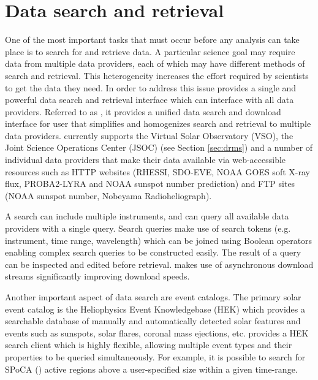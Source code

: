\section{Data search and retrieval}
\label{sec:fido}
One of the most important tasks that must occur before any analysis can take place is to search for and retrieve data.
A particular science goal may require data from multiple data providers, each of which may have different methods of search and retrieval.  
This heterogeneity
increases the effort required by scientists to get the data they need. 
In order to address this issue \sunpypkg provides a single and powerful data search and retrieval interface which can interface with all data providers. 
Referred to as \Fido, it provides a unified data search and download interface for user that simplifies and homogenizes search and retrieval to multiple data providers. 
\Fido currently supports the Virtual Solar Observatory (VSO), the Joint Science Operations Center (JSOC) (see Section \ref{sec:drms}) and a number of individual data providers that make their data available via web-accessible resources such as HTTP websites (RHESSI, SDO-EVE, NOAA GOES soft X-ray flux, PROBA2-LYRA and NOAA sunspot number prediction) and FTP sites (NOAA sunspot number, Nobeyama Radioheliograph).

A \Fido search can include multiple instruments, and can query all available data providers with a single query.  
Search queries make use of search tokens (e.g. instrument, time range, wavelength) which can be joined using Boolean operators enabling complex search queries to be constructed easily. 
The result of a query can be inspected and edited before retrieval. 
\Fido makes use of asynchronous download streams significantly improving download speeds. 


Another important aspect of data search are event catalogs. 
The primary solar event catalog is the Heliophysics Event Knowledgebase (HEK) which provides a searchable database of manually and automatically detected solar features and events such as sunspots, solar flares, coronal mass ejections, etc.  \sunpypkg provides a HEK search client which is highly flexible, allowing multiple event types and their properties to be queried simultaneously. 
For example, it is possible to search for SPoCA (\cite{2014AA...561A..29V}) active regions above a user-specified size within a given time-range.  

